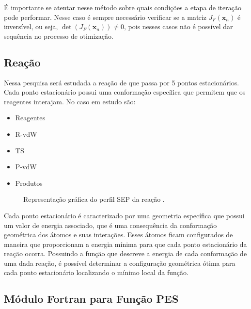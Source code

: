 É importante se atentar nesse método sobre quais condições a etapa de iteração pode performar. Nesse caso é sempre necessário verificar se a matriz $J_F(\mathbf{x}_n)$ é inversível, ou seja, $\det(J_F(\mathbf{x}_n)) \neq 0$, pois nesses casos não é possível dar sequência no processo de otimização.

\subsection{Reação }

Nessa pesquisa será estudada a reação de  que passa por 5 pontos estacionários. Cada ponto estacionário possui uma conformação específica que permitem que os reagentes interajam. No caso em estudo são:
%
\begin{itemize}[itemsep=0pt,parsep=0pt]
  \item Reagentes
  \item R-vdW
  \item TS
  \item P-vdW
  \item Produtos
\end{itemize}

\begin{figure}
  \begin{center}
    
  \end{center}
  \caption{Representação gráfica do perfil SEP da reação .}
  \label{fig:perfil_sep_fh2o}
\end{figure}

Cada ponto estacionário é caracterizado por uma geometria específica que possui um valor de energia associado, que é uma consequência da conformação geométrica dos átomos e suas interações. Esses átomos ficam configurados de maneira que proporcionam a energia mínima para que cada ponto estacionário da reação ocorra. Possuindo a função que descreve a energia de cada conformação de uma dada reação, é possível determinar a configuração geométrica ótima para cada ponto estacionário localizando o mínimo local da função.

\subsection{Módulo Fortran para Função PES}
\label{sec:module_pes}

